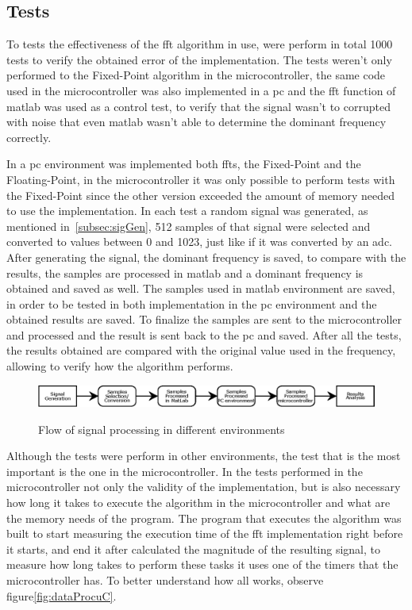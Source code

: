 \subsection{Tests}
To tests the effectiveness of the \acrshort{fft} algorithm in use, were perform in total 1000 tests to verify the obtained error of the implementation. The tests weren't only performed to the Fixed-Point algorithm in the microcontroller, the same code used in the microcontroller was also implemented in a \acrshort{pc} and the \acrshort{fft} function of \acrshort{matlab} was used as a control test, to verify that the signal wasn't to corrupted with noise that even \acrshort{matlab} wasn't able to determine the dominant frequency correctly.

In a \acrshort{pc} environment was implemented both \acrshort{fft}s, the Fixed-Point and the Floating-Point, in the microcontroller it was only possible to perform tests with the Fixed-Point since the other version exceeded the amount of memory needed to use the implementation. In each test a random signal was generated, as mentioned in~\ref{subsec:sigGen}, 512 samples of that signal were selected and converted to values between 0 and 1023, just like if it was converted by an \acrshort{adc}. After generating the signal, the dominant frequency is saved, to compare with the results, the samples are processed in \acrshort{matlab} and a dominant frequency is obtained and saved as well. The samples used in \acrshort{matlab} environment are saved, in order to be tested in both implementation in the \acrshort{pc} environment and the obtained results are saved. To finalize the samples are sent to the microcontroller and processed and the result is sent back to the \acrshort{pc} and saved. After all the tests, the results obtained are compared with the original value used in the frequency, allowing to verify how the algorithm performs. 
\begin{figure}[]
    \centering
    \includegraphics[width=1\textwidth]{Chapters/6CHP/Figures/ProcFlow.eps}
    \caption{Flow of signal processing in different environments}{}
    \label{fig:flowProc}
\end{figure}
Although the tests were perform in other environments, the test that is the most important is the one in the microcontroller. In the tests performed in the microcontroller not only the validity of the implementation, but is also necessary how long it takes to execute the algorithm in the microcontroller and what are the memory needs of the program. The program that executes the algorithm was built to start measuring the execution time of the \acrshort{fft} implementation right before it starts, and end it after calculated the magnitude of the resulting signal, to measure how long takes to perform these tasks it uses one of the timers that the microcontroller has. To better understand how all works, observe figure\ref{fig:dataProcuC}.
